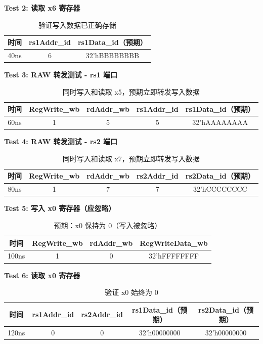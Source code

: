 \documentclass[12pt,a4paper]{article}
\begin{document}
\textbf{Test 2: 读取 x6 寄存器}

\begin{table}[H]
\centering
\begin{tabular}{|c|c|c|}
\hline
时间 & rs1Addr\_id & rs1Data\_id（预期） \\ \hline
40ns & 6 & 32'hBBBBBBBB \\ \hline
\end{tabular}
\caption{验证写入数据已正确存储}
\end{table}

\textbf{Test 3: RAW 转发测试 - rs1 端口}

\begin{table}[H]
\centering
\begin{tabular}{|c|c|c|c|c|}
\hline
时间 & RegWrite\_wb & rdAddr\_wb & rs1Addr\_id & rs1Data\_id（预期） \\ \hline
60ns & 1 & 5 & 5 & 32'hAAAAAAAA \\ \hline
\end{tabular}
\caption{同时写入和读取 x5，预期立即转发写入数据}
\end{table}

\textbf{Test 4: RAW 转发测试 - rs2 端口}

\begin{table}[H]
\centering
\begin{tabular}{|c|c|c|c|c|}
\hline
时间 & RegWrite\_wb & rdAddr\_wb & rs2Addr\_id & rs2Data\_id（预期） \\ \hline
80ns & 1 & 7 & 7 & 32'hCCCCCCCC \\ \hline
\end{tabular}
\caption{同时写入和读取 x7，预期立即转发写入数据}
\end{table}

\textbf{Test 5: 写入 x0 寄存器（应忽略）}

\begin{table}[H]
\centering
\begin{tabular}{|c|c|c|c|}
\hline
时间 & RegWrite\_wb & rdAddr\_wb & RegWriteData\_wb \\ \hline
100ns & 1 & 0 & 32'hFFFFFFFF \\ \hline
\end{tabular}
\caption{预期：x0 保持为 0（写入被忽略）}
\end{table}

\textbf{Test 6: 读取 x0 寄存器}

\begin{table}[H]
\centering
\begin{tabular}{|c|c|c|c|c|}
\hline
时间 & rs1Addr\_id & rs2Addr\_id & rs1Data\_id（预期） & rs2Data\_id（预期） \\ \hline
120ns & 0 & 0 & 32'h00000000 & 32'h00000000 \\ \hline
\end{tabular}
\caption{验证 x0 始终为 0}
\end{table}
\end{document}
